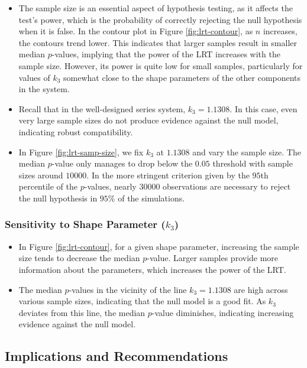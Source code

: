 \documentclass[11pt]{article}
\begin{document}
\begin{itemize}
\item The sample size is an essential aspect of hypothesis testing, as it affects the test's power, which is the probability of correctly rejecting the null hypothesis when it is false. In the contour plot in Figure \ref{fig:lrt-contour}, as $n$ increases, the contours trend lower. This indicates that larger samples result in smaller median $p$-values, implying that the power of the LRT increases with the sample size. However, its power is quite low for small samples, particularly for values of $k_3$ somewhat close to the shape parameters of the other components in the system.

\item Recall that in the well-designed series system, $k_3 = 1.1308$. In this case, even very large sample sizes do not produce evidence against the null model, indicating robust compatibility.

\item In Figure \ref{fig:lrt-samp-size}, we fix $k_3$ at $1.1308$ and vary the sample size. The median $p$-value only manages to drop below the $0.05$ threshold with sample sizes around $10000$. In the more stringent criterion given by the $95$th percentile of the $p$-values, nearly $30000$ observations are necessary to reject the null hypothesis in $95\%$ of the simulations.
\end{itemize}

\subsubsection*{Sensitivity to Shape Parameter ($k_3$)}

\begin{itemize}
\item In Figure \ref{fig:lrt-contour}, for a given shape parameter, increasing the sample size tends to decrease the median $p$-value. Larger samples provide more information about the parameters, which increases the power of the LRT.

\item The median $p$-values in the vicinity of the line $k_3 = 1.1308$ are high across various sample sizes, indicating that the null model is a good fit. As $k_3$ deviates from this line, the median $p$-value diminishes, indicating increasing evidence against the null model.
\end{itemize}

\subsection{Implications and Recommendations}
\end{document}
